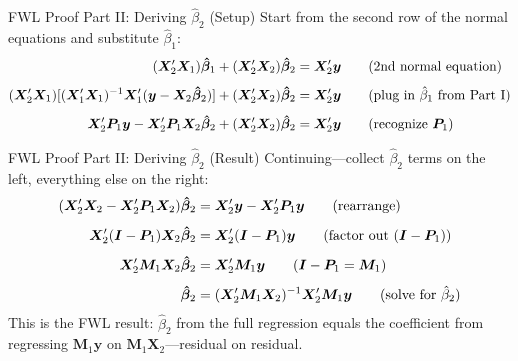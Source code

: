 \documentclass[aspectratio=169, handout, t]{beamer}
\numberwithin{equation}{section}
\begin{document}
\begin{frame}{FWL Proof Part II: Deriving $\hat{\beta}_2$ (Setup)}
Start from the second row of the normal equations and substitute $\hat{\beta}_1$:
\begin{align*}
(\bm{X}_2'\bm{X}_1)\bm{\hat{\beta}}_1+(\bm{X}_2'\bm{X}_2)\bm{\hat{\beta}}_2&=\bm{X}'_2\bm{y} \tag{2nd normal equation}\\[4pt]
(\bm{X}_2'\bm{X}_1)[(\bm{X}_1'\bm{X}_1)^{-1}\bm{X}'_1(\bm{y}-\bm{X}_2\bm{\hat{\beta}}_2)]+(\bm{X}_2'\bm{X}_2)\bm{\hat{\beta}}_2&=\bm{X}'_2\bm{y} \tag{plug in $\hat{\beta}_1$ from Part I}\\[4pt]
\bm{X}_2'\bm{P}_1\bm{y}-\bm{X}'_2\bm{P}_1\bm{X}_2\bm{\hat{\beta}}_2+(\bm{X}_2'\bm{X}_2)\bm{\hat{\beta}}_2&=\bm{X}'_2\bm{y} \tag{recognize $\bm{P}_1$}
\end{align*}
\end{frame}

\begin{frame}{FWL Proof Part II: Deriving $\hat{\beta}_2$ (Result)}
Continuing---collect $\hat{\beta}_2$ terms on the left, everything else on the right:
\begin{align*}
(\bm{X}_2'\bm{X}_2-\bm{X}'_2\bm{P}_1\bm{X}_2)\bm{\hat{\beta}}_2&=\bm{X}'_2\bm{y}-\bm{X}_2'\bm{P}_1\bm{y} \tag{rearrange}\\[4pt]
\bm{X}_2'(\bm{I}-\bm{P}_1)\bm{X}_2\bm{\hat{\beta}}_2&=\bm{X}'_2(\bm{I}-\bm{P}_1)\bm{y} \tag{factor out $(\bm{I}-\bm{P}_1)$}\\[4pt]
\bm{X}_2'\bm{M}_1\bm{X}_2\bm{\hat{\beta}}_2&=\bm{X}'_2\bm{M}_1\bm{y} \tag{$\bm{I}-\bm{P}_1=\bm{M}_1$}\\[4pt]
\bm{\hat{\beta}}_2&=(\bm{X}_2'\bm{M}_1\bm{X}_2)^{-1}\bm{X}'_2\bm{M}_1\bm{y} \tag{solve for $\hat{\beta}_2$}
\end{align*}
This is the FWL result: $\hat{\beta}_2$ from the full regression equals the coefficient from regressing $\bm{M}_1\bm{y}$ on $\bm{M}_1\bm{X}_2$---residual on residual.
\end{frame}
\end{document}
